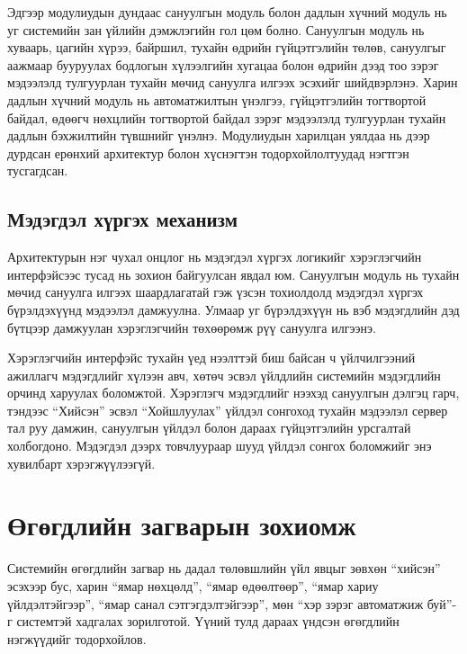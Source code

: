 Эдгээр модулиудын дундаас сануулгын модуль болон дадлын хүчний модуль нь уг системийн зан үйлийн дэмжлэгийн гол цөм болно. Сануулгын модуль нь хуваарь, цагийн хүрээ, байршил, тухайн өдрийн гүйцэтгэлийн төлөв, сануулгыг аажмаар бууруулах бодлогын хүлээлгийн хугацаа болон өдрийн дээд тоо зэрэг мэдээлэлд тулгуурлан тухайн мөчид сануулга илгээх эсэхийг шийдвэрлэнэ. Харин дадлын хүчний модуль нь автоматжилтын үнэлгээ, гүйцэтгэлийн тогтвортой байдал, өдөөгч нөхцлийн тогтвортой байдал зэрэг мэдээлэлд тулгуурлан тухайн дадлын бэхжилтийн түвшнийг үнэлнэ. Модулиудын харилцан уялдаа нь дээр дурдсан ерөнхий архитектур болон хүснэгтэн тодорхойлолтуудад нэгтгэн тусгагдсан.

\subsection{Мэдэгдэл хүргэх механизм}

Архитектурын нэг чухал онцлог нь мэдэгдэл хүргэх логикийг хэрэглэгчийн интерфэйсээс тусад нь зохион байгуулсан явдал юм. Сануулгын модуль нь тухайн мөчид сануулга илгээх шаардлагатай гэж үзсэн тохиолдолд мэдэгдэл хүргэх бүрэлдэхүүнд мэдээлэл дамжуулна. Улмаар уг бүрэлдэхүүн нь вэб мэдэгдлийн дэд бүтцээр дамжуулан хэрэглэгчийн төхөөрөмж рүү сануулга илгээнэ.

Хэрэглэгчийн интерфэйс тухайн үед нээлттэй биш байсан ч үйлчилгээний ажиллагч мэдэгдлийг хүлээн авч, хөтөч эсвэл үйлдлийн системийн мэдэгдлийн орчинд харуулах боломжтой. Хэрэглэгч мэдэгдлийг нээхэд сануулгын дэлгэц гарч, тэндээс ``Хийсэн'' эсвэл ``Хойшлуулах'' үйлдэл сонгоход тухайн мэдээлэл сервер тал руу дамжин, сануулгын үйлдэл болон дараах гүйцэтгэлийн урсгалтай холбогдоно. Мэдэгдэл дээрх товчлуураар шууд үйлдэл сонгох боломжийг энэ хувилбарт хэрэгжүүлээгүй.

\section{Өгөгдлийн загварын зохиомж}

Системийн өгөгдлийн загвар нь дадал төлөвшлийн үйл явцыг зөвхөн ``хийсэн'' эсэхээр бус, харин ``ямар нөхцөлд'', ``ямар өдөөлтөөр'', ``ямар хариу үйлдэлтэйгээр'', ``ямар санал сэтгэгдэлтэйгээр'', мөн ``хэр зэрэг автоматжиж буй''-г системтэй хадгалах зорилготой. Үүний тулд дараах үндсэн өгөгдлийн нэгжүүдийг тодорхойлов.

